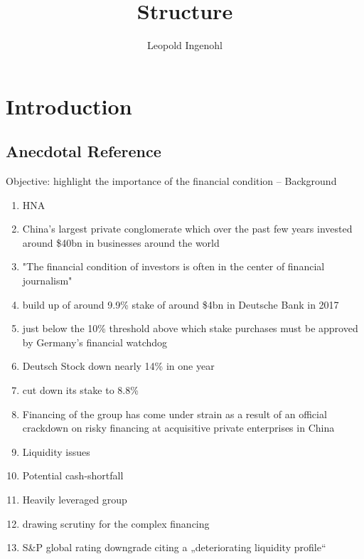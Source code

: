 \documentclass[12pt]{article}
\title{Structure}
\author{Leopold Ingenohl}
\begin{document}
\maketitle

\section{Introduction}

\subsection{Anecdotal Reference}
\begin{center} 
Objective: highlight the importance of the financial condition -- Background
\end{center}

    \begin{enumerate}
		\item HNA
		\item China’s largest private conglomerate which over the past few years invested around \$40bn in businesses around the world 
        \item "The financial condition of investors is often in the center of financial journalism"
        \item build up of around 9.9\% stake of around \$4bn in Deutsche Bank in 2017 
        \item just below the 10\% threshold above which stake purchases must be approved by Germany’s financial watchdog 
		\item Deutsch Stock down nearly 14\% in one year
		\item cut down its stake to 8.8\%
		
        \item Financing of the group has come under strain as a result of an official crackdown on risky financing at acquisitive private enterprises in China 
		\item Liquidity issues 
		\item Potential cash-shortfall
        \item Heavily leveraged group
        \item drawing scrutiny for the complex financing
		\item S\&P global rating downgrade citing a „deteriorating liquidity profile“
		
    \end{enumerate}
\end{document}
